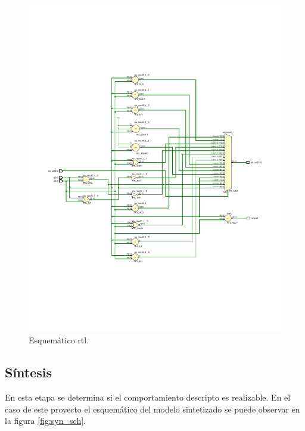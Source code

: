 \documentclass[
    11pt,
    spanish,
	a4paper
]{article}
\begin{document}
\begin{figure}
    \centering
    \includegraphics[width=\textwidth]{img/rtl_schematic.pdf}
    \caption{Esquemático rtl.}
    \label{fig:rtl_sch}
\end{figure}

\subsection{Síntesis}
\label{subsec:sintesis}

En esta etapa se determina si el comportamiento descripto es realizable.
En el caso de este proyecto el esquemático del modelo sintetizado se puede observar en la figura \ref{fig:syn_sch}.
\end{document}
